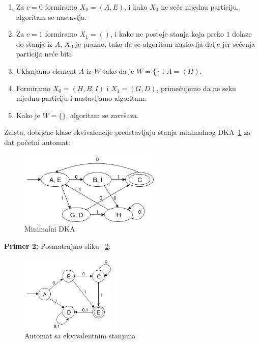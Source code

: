 \documentclass[a4paper]{article}
\begin{document}
\begin{enumerate}
\item Za $c = 0$ formiramo $X_{0} = (A, E)$, i kako $X_{0}$ ne seče nijednu particiju, algoritam se nastavlja.
\item Za $c = 1$ formiramo $X_{1} = ()$, i kako ne postoje stanja koja preko $1$ dolaze do stanja iz $A$, $X_{0}$ je prazno, tako da se algoritam nastavlja dalje jer sečenja particija neće biti.
\item Uklanjamo element $A$ iz $W$ tako da je $W = \{\}$ i $A = (H)$.
\item Formiramo $X_{0} = (H, B, I)$ i $X_{1} = (G, D)$, primećujemo da ne seku nijednu particiju i nastavljamo algoritam.
\item Kako je $W = \{\}$, algoritam se završava.
\end{enumerate}

Zaista, dobijene klase ekvivalencije predstavljaju stanja minimalnog DKA~\ref{fig:slika2} za dat početni automat:

\begin{figure}[H]
\centering
\includegraphics[width=0.6\textwidth]{Slike/autom2.png}
\caption{\label{fig:slika2}Minimalni DKA}
\end{figure}

\newpage

\noindent \textbf{Primer 2:}
Posmatrajmo sliku ~\ref{fig:slika3}:

\begin{figure}[H]
\centering
\includegraphics[width=0.4\textwidth]{Slike/autom3.png}
\caption{\label{fig:slika3}Automat sa ekvivalentnim stanjima}
\end{figure}
\end{document}
